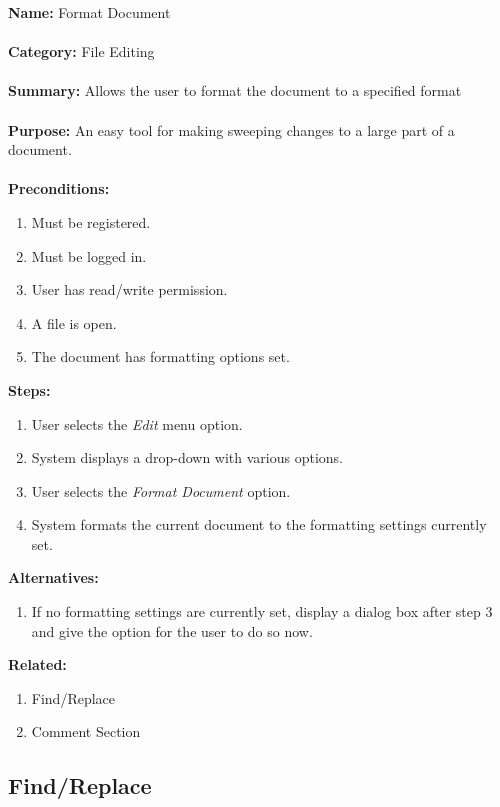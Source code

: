 \documentclass[14pt, a4paper]{article}
\begin{document}
\begin{framed}
	\noindent\textbf{Name:} Format Document \\ \\
	\textbf{Category:} File Editing \\ \\
	\textbf{Summary:} Allows the user to format the document to a specified format \\ \\
	\textbf{Purpose:} An easy tool for making sweeping changes to a large part of a document. \\ \\
	\textbf{Preconditions:} 
	\begin{enumerate}
		\item Must be registered.
		\item Must be logged in.
		\item User has read/write permission.
		\item A file is open.
		\item The document has formatting options set.
	\end{enumerate}
	\textbf{Steps:}
	\begin{enumerate}
		\item User selects the \textit{Edit} menu option.
		\item System displays a drop-down with various options.
		\item User selects the \textit{Format Document} option.
		\item System formats the current document to the formatting settings currently set.
	\end{enumerate}
	\textbf{Alternatives:}
	\begin{enumerate}
		\item If no formatting settings are currently set, display a dialog box after step 3 and give the option for the user to do so now.
	\end{enumerate}
	\textbf{Related:}
	\begin{enumerate}
		\item Find/Replace
		\item Comment Section
	\end{enumerate}
\end{framed}

\newpage

\subsection{Find/Replace}
\end{document}

